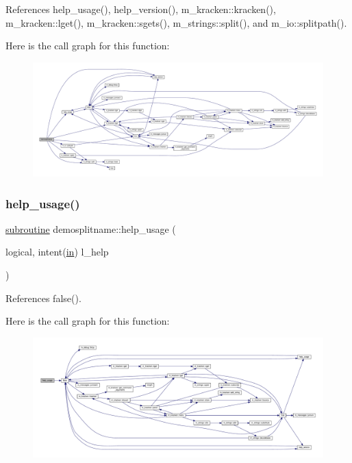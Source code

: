 References help\+\_\+usage(), help\+\_\+version(), m\+\_\+kracken\+::kracken(), m\+\_\+kracken\+::lget(), m\+\_\+kracken\+::sgets(), m\+\_\+strings\+::split(), and m\+\_\+io\+::splitpath().

Here is the call graph for this function\+:
\nopagebreak
\begin{figure}[H]
\begin{center}
\leavevmode
\includegraphics[width=350pt]{splitname_8f90_a58447edeccd89127101d970f9b98a35c_cgraph}
\end{center}
\end{figure}
\mbox{\label{splitname_8f90_ae98d08b210b063a2558aa2abdb67fa8e}} 
\subsubsection{\texorpdfstring{help\+\_\+usage()}{help\_usage()}}
{\footnotesize\ttfamily \hyperlink{M__stopwatch_83_8txt_acfbcff50169d691ff02d4a123ed70482}{subroutine} demosplitname\+::help\+\_\+usage (\begin{DoxyParamCaption}\item[{logical, intent(\hyperlink{M__journal_83_8txt_afce72651d1eed785a2132bee863b2f38}{in})}]{l\+\_\+help }\end{DoxyParamCaption})}



References false().

Here is the call graph for this function\+:
\nopagebreak
\begin{figure}[H]
\begin{center}
\leavevmode
\includegraphics[width=350pt]{splitname_8f90_ae98d08b210b063a2558aa2abdb67fa8e_cgraph}
\end{center}
\end{figure}
\mbox{\label{splitname_8f90_a2518cc098132c46ba9d8fd8c74d8fc0d}} 
